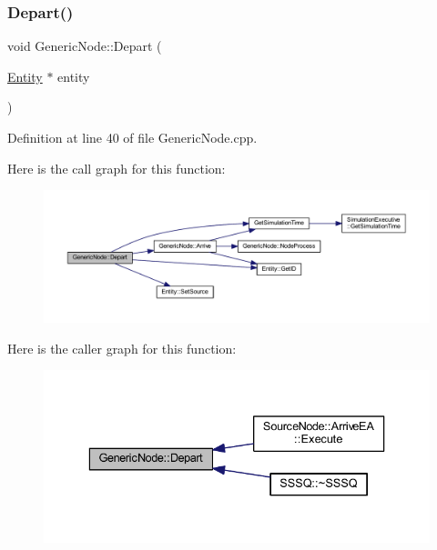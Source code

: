 \subsubsection{\texorpdfstring{Depart()}{Depart()}}
{\footnotesize\ttfamily void Generic\+Node\+::\+Depart (\begin{DoxyParamCaption}\item[{\hyperlink{class_entity}{Entity} $\ast$}]{entity }\end{DoxyParamCaption})\hspace{0.3cm}{\ttfamily [protected]}}



Definition at line 40 of file Generic\+Node.\+cpp.

Here is the call graph for this function\+:\nopagebreak
\begin{figure}[H]
\begin{center}
\leavevmode
\includegraphics[width=350pt]{class_generic_node_a2d573208cd3bc049c7068a331c6cd294_cgraph}
\end{center}
\end{figure}
Here is the caller graph for this function\+:\nopagebreak
\begin{figure}[H]
\begin{center}
\leavevmode
\includegraphics[width=336pt]{class_generic_node_a2d573208cd3bc049c7068a331c6cd294_icgraph}
\end{center}
\end{figure}
\mbox{\label{class_generic_node_aa73c27d677012efdcda65f7908c77758}} 
